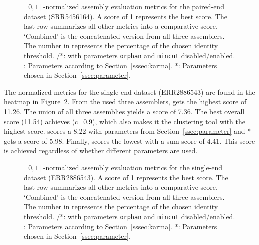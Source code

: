 \documentclass[12pt,a4paper,english]{article}
\begin{document}
	\begin{figure}[H]
		\hspace{-13pt}
		\def\svgwidth{1.1\textwidth}
		
		\caption[Normalized assembly evaluation metrics (\celegans, PE, SRR5456164).]{$[0,1]$-normalized assembly evaluation metrics for the paired-end \celegans dataset (SRR5456164). A score of 1 represents the best score. The last row summarizes all other metrics into a comparative score. `Combined' is the concatenated version from all three assemblers. The number in \cdhit represents the percentage of the chosen identity threshold. \grouper/\grouper{}*: \grouper with parameters \texttt{orphan} and \texttt{mincut} disabled/enabled. \karma: Parameters according to Section~\ref{sssec:karma}. \karma{}*: Parameters chosen in Section~\ref{ssec:parameter}. }
		\label{img:cel_pe}
	\end{figure}
	\newpage

	The normalized metrics for the single-end \celegans dataset (ERR2886543) are found in the heatmap in Figure~\ref{img:cel_se}.  From the used three assemblers, \spades gets the highest score of 11.26. The union of all three assemblies yields a score of 7.36. The best overall score (11.54) achieves \cdhit (c=0.9), which also makes it the clustering tool with the highest score. \karma scores a 8.22 with parameters from Section~\ref{ssec:parameter} and \karma{}* gets a score of 5.98.
	Finally, \grouper scores the lowest with a sum score of 4.41. This score is achieved regardless of whether different parameters are used.\\
	

	\begin{figure}[H]
		\hspace{-13pt}
		\def\svgwidth{1.1\textwidth}
		
		\caption[Normalized assembly evaluation metrics (\celegans, SE, ERR2886543).]{$[0,1]$-normalized assembly evaluation metrics for the single-end \celegans dataset (ERR2886543). A score of 1 represents the best score. The last row summarizes all other metrics into a comparative score. `Combined' is the concatenated version from all three assemblers. The number in \cdhit represents the percentage of the chosen identity threshold. \grouper/\grouper{}*: \grouper with parameters \texttt{orphan} and \texttt{mincut} disabled/enabled. \karma: Parameters according to Section~\ref{sssec:karma}. \karma{}*: Parameters chosen in Section~\ref{ssec:parameter}.}
		\label{img:cel_se}
	\end{figure}
\end{document}
